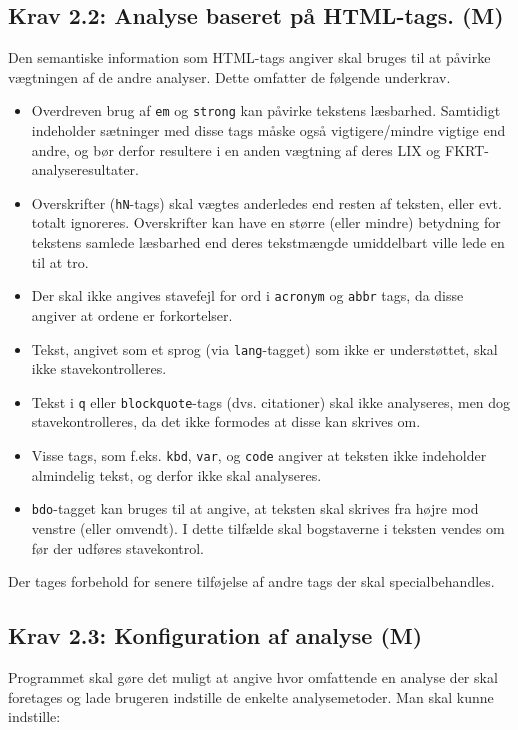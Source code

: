 \documentclass[a4paper,oneside,article]{memoir}
\begin{document}
\subsection{Krav 2.2: Analyse baseret på HTML-tags. (M)}
Den semantiske information som HTML-tags angiver skal bruges til at
påvirke vægtningen af de andre analyser. Dette omfatter de følgende
underkrav.


\begin{itemize}
\item Overdreven brug af \texttt{em} og \texttt{strong} kan påvirke
  tekstens læsbarhed. Samtidigt indeholder sætninger med disse tags
  måske også vigtigere/mindre vigtige end andre, og bør derfor
  resultere i en anden vægtning af deres LIX og
  FKRT-analyseresultater.
\item Overskrifter (\texttt{hN}-tags) skal vægtes anderledes end
  resten af teksten, eller evt. totalt ignoreres. Overskrifter kan
  have en større (eller mindre) betydning for tekstens samlede
  læsbarhed end deres tekstmængde umiddelbart ville lede en til at
  tro.
\item Der skal ikke angives stavefejl for ord i \texttt{acronym} og
  \texttt{abbr} tags, da disse angiver at ordene er forkortelser.
\item Tekst, angivet som et sprog (via \texttt{lang}-tagget) som ikke
  er understøttet, skal ikke stavekontrolleres.
\item Tekst i \texttt{q} eller \texttt{blockquote}-tags
  (dvs. citationer) skal ikke analyseres, men dog stavekontrolleres,
  da det ikke formodes at disse kan skrives om.
\item Visse tags, som f.eks. \texttt{kbd}, \texttt{var}, og
  \texttt{code} angiver at teksten ikke indeholder almindelig tekst,
  og derfor ikke skal analyseres.
\item \texttt{bdo}-tagget kan bruges til at angive, at teksten skal
  skrives fra højre mod venstre (eller omvendt). I dette tilfælde skal
  bogstaverne i teksten vendes om før der udføres stavekontrol.
\end{itemize}

Der tages forbehold for senere tilføjelse af andre tags der skal
specialbehandles.

\subsection{Krav 2.3: Konfiguration af analyse (M)}
Programmet skal gøre det muligt at angive hvor omfattende en analyse
der skal foretages og lade brugeren indstille de enkelte
analysemetoder. Man skal kunne indstille:
\end{document}
